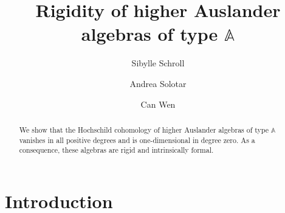 \documentclass{amsart}
\title{Rigidity of  higher Auslander algebras of type $\mathbb{A}$
}
\date{}
\theoremstyle{plain}
\theoremstyle{definition}
\numberwithin{equation}{section}
\begin{document}
\begin{abstract}
    We show that the Hochschild cohomology of higher Auslander algebras of type $\mathbb{A}$ vanishes in all positive degrees and is one-dimensional in degree zero. As a consequence,  these algebras are rigid and intrinsically formal.
\end{abstract}

\author{Sibylle Schroll}
\address{Department Mathematik, Universit\"at zu K\"oln, Weyertal 86-90, 50931 K\"oln, Germany}

\author{Andrea Solotar}
\address{  IMAS-CONICET and Departamento de Matemática, Facultad de Ciencias Exactas y Naturales, Universidad de Buenos Aires, Pabellon I, Ciudad Universitaria, Buenos Aires, 1428, Argentina and Guangdong Technion Israel Institute of Technology, Shantou, Guangdong Province, China.} 

\author{Can Wen}
\address{School of Mathematical Sciences, Laboratory of Mathematics and Complex Systems, Beijing Normal University, Beijing 100875, China and Department Mathematik, Universit\"at zu K\"oln, Weyertal 86-90, 50931 K\"oln, Germany.
}


\maketitle

\section{Introduction}
\end{document}
